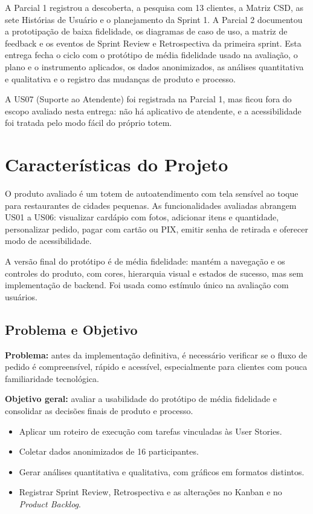 \documentclass[12pt, oneside, a4paper, chapter=TITLE,section=TITLE]{abntex2}
\begin{document}
A Parcial 1 registrou a descoberta, a pesquisa com 13 clientes, a Matriz CSD, as sete Histórias de Usuário e o planejamento da Sprint 1. A Parcial 2 documentou a prototipação de baixa fidelidade, os diagramas de caso de uso, a matriz de feedback e os eventos de Sprint Review e Retrospectiva da primeira sprint. Esta entrega fecha o ciclo com o protótipo de média fidelidade usado na avaliação, o plano e o instrumento aplicados, os dados anonimizados, as análises quantitativa e qualitativa e o registro das mudanças de produto e processo.

A US07 (Suporte ao Atendente) foi registrada na Parcial 1, mas ficou fora do escopo avaliado nesta entrega: não há aplicativo de atendente, e a acessibilidade foi tratada pelo modo fácil do próprio totem.

\chapter{Características do Projeto}

O produto avaliado é um totem de autoatendimento com tela sensível ao toque para restaurantes de cidades pequenas. As funcionalidades avaliadas abrangem US01 a US06: visualizar cardápio com fotos, adicionar itens e quantidade, personalizar pedido, pagar com cartão ou PIX, emitir senha de retirada e oferecer modo de acessibilidade.

A versão final do protótipo é de média fidelidade: mantém a navegação e os controles do produto, com cores, hierarquia visual e estados de sucesso, mas sem implementação de backend. Foi usada como estímulo único na avaliação com usuários.

\section{Problema e Objetivo}

\textbf{Problema:} antes da implementação definitiva, é necessário verificar se o fluxo de pedido é compreensível, rápido e acessível, especialmente para clientes com pouca familiaridade tecnológica.

\textbf{Objetivo geral:} avaliar a usabilidade do protótipo de média fidelidade e consolidar as decisões finais de produto e processo.

\begin{itemize}
    \item Aplicar um roteiro de execução com tarefas vinculadas às User Stories.
    \item Coletar dados anonimizados de 16 participantes.
    \item Gerar análises quantitativa e qualitativa, com gráficos em formatos distintos.
    \item Registrar Sprint Review, Retrospectiva e as alterações no Kanban e no \textit{Product Backlog}.
\end{itemize}
\end{document}
